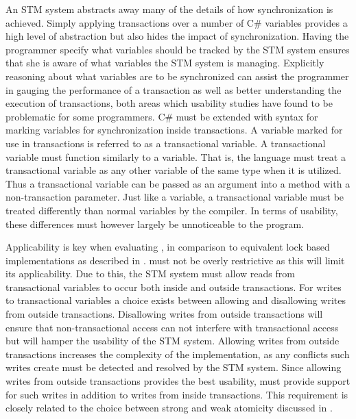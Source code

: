 An \ac{STM} system abstracts away many of the details of how synchronization is achieved. Simply applying transactions over a number of C\# variables provides a high level of abstraction but also hides the impact of synchronization. Having the programmer specify what variables should be tracked by the \ac{STM} system ensures that she is aware of what variables the \ac{STM} system is managing. Explicitly reasoning about what variables are to be synchronized can assist the programmer in gauging the performance of a transaction as well as better understanding the execution of transactions, both areas which usability studies\cite{rossbach2010transactional}\cite{pankratius2009does} have found to be problematic for some programmers. C\# must be extended with syntax for marking variables for synchronization inside transactions.  A variable marked for use in transactions is referred to as a transactional variable. A transactional variable must function similarly to a  variable. That is, the language must treat a transactional variable as any other variable of the same type when it is utilized. Thus a transactional variable can be passed as an argument into a method with a non-transaction parameter. Just like a  variable, a transactional variable must be treated differently than normal variables by the compiler. In terms of usability, these differences must however largely be unnoticeable to the program.

Applicability is key when evaluating \stmname, in comparison to equivalent lock based implementations as described in . \stmnamesp must not be overly restrictive as this will limit its applicability. Due to this, the \ac{STM} system must allow reads from transactional variables to occur both inside and outside transactions. For writes to transactional variables a choice exists between allowing and disallowing writes from outside transactions. Disallowing writes from outside transactions will ensure that non-transactional access can not interfere with transactional access but will hamper the usability of the \ac{STM} system. Allowing writes from outside transactions increases the complexity of the implementation, as any conflicts such writes create must be detected and resolved by the \ac{STM} system. Since allowing writes from outside transactions provides the best usability, \stmnamesp must provide support for such writes in addition to writes from inside transactions. This requirement is closely related to the choice between strong and weak atomicity discussed in .

